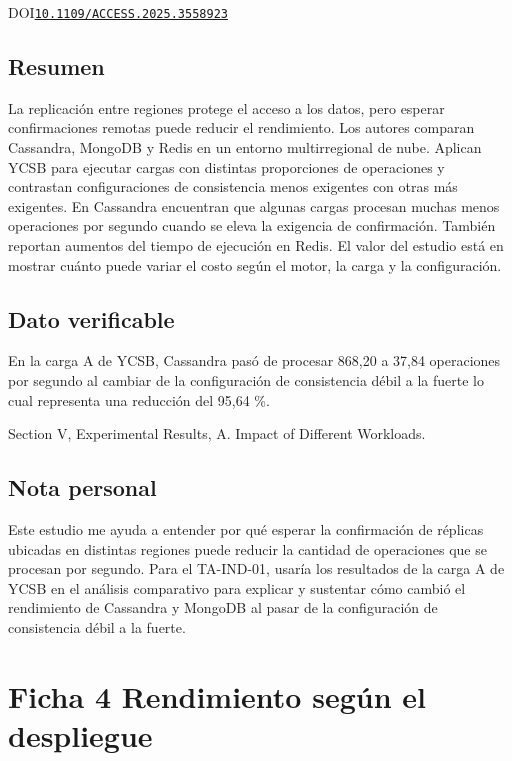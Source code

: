 \documentclass[11pt,a4paper,onecolumn]{article}
\begin{document}
\noindent\cite{ferreira_benchmarking_2025}\enspace{}

\noindent DOI\enspace\href{https://doi.org/10.1109/ACCESS.2025.3558923}{\nolinkurl{10.1109/ACCESS.2025.3558923}}

\subsection*{Resumen}

La replicación entre regiones protege el acceso a los datos, pero esperar confirmaciones remotas puede reducir el rendimiento. Los autores comparan Cassandra, MongoDB y Redis en un entorno multirregional de nube. Aplican YCSB para ejecutar cargas con distintas proporciones de operaciones y contrastan configuraciones de consistencia menos exigentes con otras más exigentes. En Cassandra encuentran que algunas cargas procesan muchas menos operaciones por segundo cuando se eleva la exigencia de confirmación. También reportan aumentos del tiempo de ejecución en Redis. El valor del estudio está en mostrar cuánto puede variar el costo según el motor, la carga y la configuración.

\subsection*{Dato verificable}

En la carga A de YCSB, Cassandra pasó de procesar 868,20 a 37,84 operaciones por segundo al cambiar de la configuración de consistencia débil a la fuerte lo cual representa una reducción del 95,64 \%.

Section V, Experimental Results,  A. Impact of Different Workloads.

\subsection*{Nota personal}

Este estudio me ayuda a entender por qué esperar la confirmación de réplicas ubicadas en distintas regiones puede reducir la cantidad de operaciones que se procesan por segundo. Para el TA-IND-01, usaría los resultados de la carga A de YCSB en el análisis comparativo para explicar y sustentar cómo cambió el rendimiento de Cassandra y MongoDB al pasar de la configuración de consistencia débil a la fuerte.

\clearpage

\section*{Ficha 4 Rendimiento según el despliegue}
\end{document}

